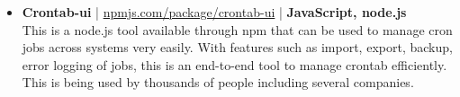 \begin{itemize}
 \item \textbf{Crontab-ui} | \href{http://npmjs.com/package/crontab-ui}{npmjs.com/package/crontab-ui} | \textbf{JavaScript, node.js}\\
 This is a node.js tool available through npm that can be used to manage cron jobs across systems very easily. With features such as import, export, backup, error logging of jobs, this is an end-to-end tool to manage crontab efficiently. This is being used by thousands of people including several companies.




\end{itemize}
\vspace{5pt}
